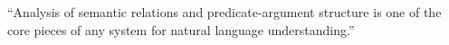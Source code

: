 ``Analysis of semantic relations and predicate-argument structure is one of the core pieces of any
system for natural language understanding.'' \citep{palmer2010semantic}

%
%
%
%
%
%
%
%
%
%
%
